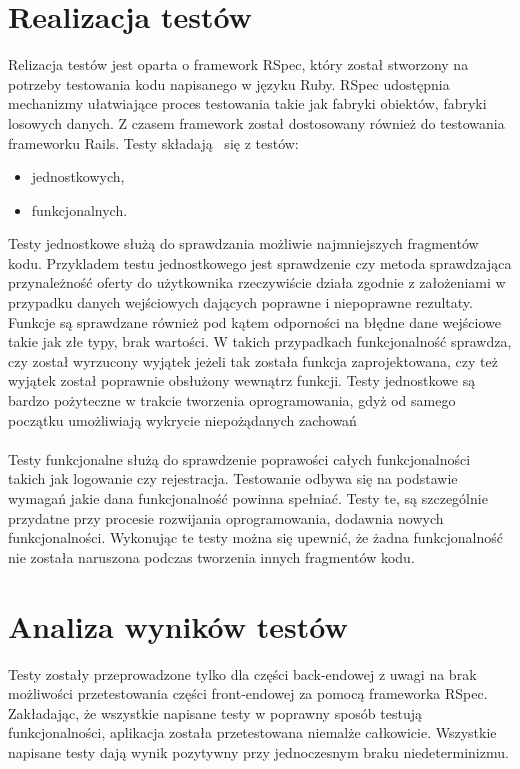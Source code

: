 \section{Realizacja testów}
Relizacja testów jest oparta o framework RSpec, który został stworzony na potrzeby testowania kodu napisanego w języku Ruby. RSpec udostępnia mechanizmy ułatwiające proces testowania takie jak fabryki obiektów, fabryki losowych danych. Z czasem framework został dostosowany również do testowania frameworku Rails. Testy składają  się z testów:
\begin{itemize}
\item jednostkowych,
\item funkcjonalnych.
\end{itemize}
Testy jednostkowe służą do sprawdzania możliwie najmniejszych fragmentów kodu. Przykladem testu jednostkowego jest sprawdzenie czy metoda sprawdzająca przynależność oferty do użytkownika rzeczywiście działa zgodnie z założeniami w przypadku danych wejściowych dających poprawne i niepoprawne rezultaty. Funkcje są sprawdzane również pod kątem odporności na błędne dane wejściowe takie jak złe typy, brak wartości. W takich przypadkach funkcjonalność sprawdza, czy został wyrzucony wyjątek jeżeli tak została funkcja zaprojektowana, czy też wyjątek został poprawnie obsłużony wewnątrz funkcji. Testy jednostkowe są bardzo pożyteczne w trakcie tworzenia oprogramowania, gdyż od samego początku umożliwiają wykrycie niepożądanych zachowań\\
\\
Testy funkcjonalne służą do sprawdzenie poprawości całych funkcjonalności takich jak logowanie czy rejestracja. Testowanie odbywa się na podstawie wymagań jakie dana funkcjonalność powinna spełniać. Testy te, są szczególnie przydatne przy procesie rozwijania oprogramowania, dodawnia nowych funkcjonalności. Wykonując te testy można się upewnić, że żadna funkcjonalność nie została naruszona podczas tworzenia innych fragmentów kodu.

\section{Analiza wyników testów}
Testy zostały przeprowadzone tylko dla części back-endowej z uwagi na brak możliwości przetestowania części front-endowej za pomocą frameworka RSpec. Zakładając, że wszystkie napisane testy w poprawny sposób testują funkcjonalności, aplikacja została przetestowana niemalże całkowicie. Wszystkie napisane testy dają wynik pozytywny przy jednoczesnym braku niedeterminizmu.
